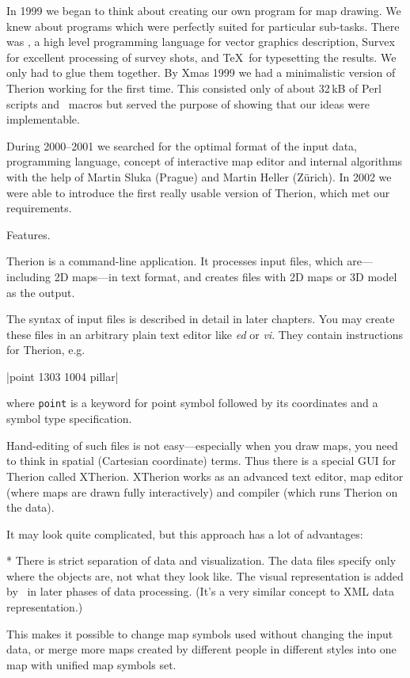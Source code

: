 In 1999 we began to think about creating our own program for map drawing. We knew 
about programs which were perfectly suited for particular sub-tasks. There 
was \MP, a high level programming language for vector graphics description, 
Survex for excellent processing of survey shots, and \TeX\ for typesetting the 
results. We only had to glue them together. By Xmas 
1999 we had a minimalistic version of Therion working for the first time. This 
consisted only of about 32\,kB of Perl scripts and \MP\ macros but served the 
purpose of showing that our ideas were implementable.

During 2000--2001 we searched for the optimal format of the input data, programming 
language, concept of interactive map editor and internal algorithms with the 
help of Martin Sluka (Prague) and Martin Heller (Z\"urich). In 2002 we were able to 
introduce the first really usable version of Therion, which met our requirements.


\subchapter Features.

Therion is a command-line application. It processes input files, which 
are---including 2D maps---in text format, and creates files with 2D maps or 
3D model as the output.

The syntax of input files is described in detail in later chapters. 
You may create these files in an arbitrary plain text editor like 
{\it ed} or {\it vi}. They contain instructions for Therion, e.g. 

|point 1303 1004 pillar| 

where {\tt point} is a keyword for point symbol 
followed by its coordinates and a symbol type specification.

Hand-editing of such files is not easy---especially when you draw maps, you 
need to think in spatial (Cartesian coordinate) terms. Thus there is a special 
GUI for Therion called XTherion. XTherion works as an advanced text editor, map 
editor (where maps are drawn fully interactively) and compiler (which runs
Therion on the data).

It may look quite complicated, but this approach has a lot of advantages:

\list
* There is strict separation of data and visualization. The data files specify 
  only where the objects are, not what they look like. The visual representation 
  is added by \MP\ in later phases of data processing. (It's a very 
  similar concept to XML data representation.) 
  
  This makes it possible to change map symbols used without changing the 
  input data, or merge more maps created by different people in different 
  styles into one map with unified map symbols set.

